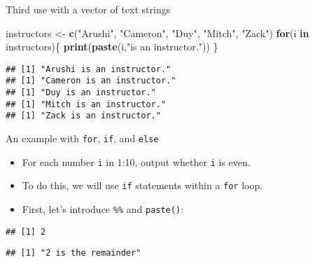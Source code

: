 \documentclass[ignorenonframetext,]{beamer}
\newenvironment{Shaded}{\begin{snugshade}}{\end{snugshade}}
\newcommand{\KeywordTok}[1]{\textcolor[rgb]{0.13,0.29,0.53}{\textbf{#1}}}
\newcommand{\DecValTok}[1]{\textcolor[rgb]{0.00,0.00,0.81}{#1}}
\newcommand{\StringTok}[1]{\textcolor[rgb]{0.31,0.60,0.02}{#1}}
\newcommand{\ControlFlowTok}[1]{\textcolor[rgb]{0.13,0.29,0.53}{\textbf{#1}}}
\newcommand{\OperatorTok}[1]{\textcolor[rgb]{0.81,0.36,0.00}{\textbf{#1}}}
\newcommand{\NormalTok}[1]{#1}
\providecommand{\tightlist}{%
	\setlength{\itemsep}{0pt}\setlength{\parskip}{0pt}}
\begin{document}
\begin{frame}[fragile]{Third use with a vector of text strings}

\begin{Shaded}
\begin{Highlighting}[]
\NormalTok{instructors <-}\StringTok{ }\KeywordTok{c}\NormalTok{(}\StringTok{"Arushi"}\NormalTok{, }\StringTok{"Cameron"}\NormalTok{, }\StringTok{"Duy"}\NormalTok{, }
                 \StringTok{"Mitch"}\NormalTok{, }\StringTok{"Zack"}\NormalTok{)}
\ControlFlowTok{for}\NormalTok{(i }\ControlFlowTok{in}\NormalTok{ instructors)\{}
  \KeywordTok{print}\NormalTok{(}\KeywordTok{paste}\NormalTok{(i,}\StringTok{"is an instructor."}\NormalTok{))}
\NormalTok{\}}
\end{Highlighting}
\end{Shaded}

\begin{verbatim}
## [1] "Arushi is an instructor."
## [1] "Cameron is an instructor."
## [1] "Duy is an instructor."
## [1] "Mitch is an instructor."
## [1] "Zack is an instructor."
\end{verbatim}

\end{frame}

\begin{frame}[fragile]{An example with \texttt{for}, \texttt{if}, and
\texttt{else}}

\begin{itemize}
\tightlist
\item
  For each number \texttt{i} in 1:10, output whether \texttt{i} is even.
\item
  To do this, we will use \texttt{if} statements within a \texttt{for}
  loop.
\item
  First, let's introduce \texttt{\%\%} and \texttt{paste()}:
\end{itemize}

\begin{Shaded}
\end{Shaded}

\begin{verbatim}
## [1] 2
\end{verbatim}

\begin{Shaded}
\end{Shaded}

\begin{verbatim}
## [1] "2 is the remainder"
\end{verbatim}

\end{frame}
\end{document}
